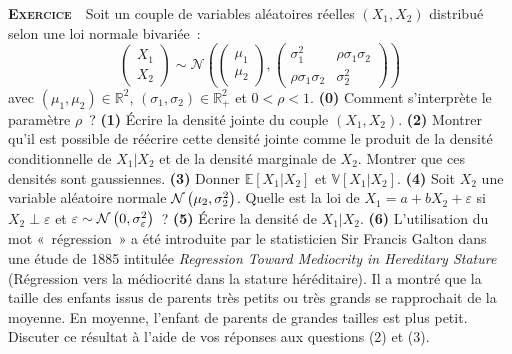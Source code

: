 \documentclass[10pt,a4paper,notitlepage]{article}
\newcounter{xnumber}
\newcommand{\exercice}{\refstepcounter{xnumber}\textsc{\textbf{Exercice}} \textbf{\thexnumber}\,\,}
\newcommand{\question}[1]{\textbf{(#1)}}
\begin{document}
\exercice\label{ex:normale-bivariee} Soit un couple de variables aléatoires réelles $(X_1, X_2)$ distribué selon une loi normale bivariée~:
\[
  \begin{pmatrix}
    X_1\\
    X_2
  \end{pmatrix}
  \sim
  \mathcal N
  \left(
    \begin{pmatrix}
      \mu_1\\
      \mu_2
    \end{pmatrix},
    \begin{pmatrix}
      \sigma_1^2 & \rho\sigma_1\sigma_2\\
      \rho\sigma_1\sigma_2 & \sigma_2^2
    \end{pmatrix}
  \right)
\]
avec $(\mu_1, \mu_2)\in\mathbb R^2$, $(\sigma_1, \sigma_2)\in\mathbb R_+^2$ et
$0<\rho<1$. \question{0} Comment s'interprète le paramètre $\rho$~? \question{1}
Écrire la densité jointe du couple $(X_1, X_2)$. \question{2} Montrer qu'il est
possible de réécrire cette densité jointe comme le produit de la densité
conditionnelle de $X_1|X_2$ et de la densité marginale de $X_2$. Montrer que ces
densités sont gaussiennes. \question{3} Donner $\mathbb E[X_1|X_2]$ et
$\mathbb V[X_1|X_2]$. \question{4} Soit $X_2$ une variable aléatoire normale
$\mathcal N\left(\mu_2,\sigma_2^2\right)$. Quelle est la loi de
$X_1 = a + bX_2 + \varepsilon$ si $X_2\perp\varepsilon$ et
$\varepsilon\sim\mathcal N\left(0,\sigma_{\varepsilon}^2\right)$~? \question{5} Écrire la
densité de $X_1|X_2$. \question{6} L'utilisation du mot «~régression~» a été
introduite par le statisticien Sir Francis Galton dans une étude de 1885
intitulée \emph{Regression Toward Mediocrity in Hereditary Stature}
(Régression vers la médiocrité dans la stature héréditaire). Il a montré que la
taille des enfants issus de parents très petits ou très grands se rapprochait de
la moyenne. En moyenne, l'enfant de parents de grandes tailles est plus petit.
Discuter ce résultat à l'aide de vos réponses aux questions (2) et (3).\newline
\end{document}
